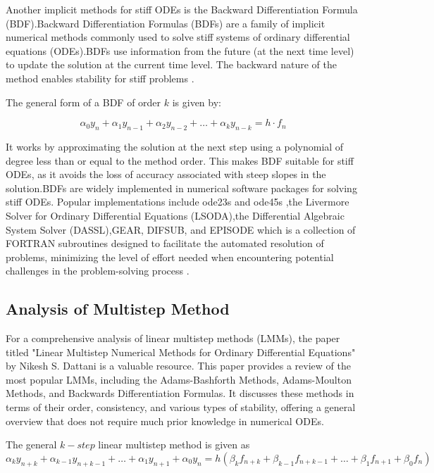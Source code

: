 Another implicit methods for stiff ODEs is the Backward Differentiation Formula (BDF).Backward Differentiation Formulas (BDFs) are a family of implicit numerical methods commonly used to solve stiff systems of ordinary differential equations (ODEs).BDFs use information from the future (at the next time level) to update the solution at the current time level. The backward nature of the method enables stability for stiff problems \cite{numericalrecipes}.

The general form of a BDF of order \(k\) is given by:

\begin{equation}
  \alpha_0 y_n + \alpha_1 y_{n-1} + \alpha_2 y_{n-2} + \ldots + \alpha_k y_{n-k} = h \cdot f_n
\end{equation}


It works by approximating the solution at the next step using a polynomial of degree less than or equal to the method order. This makes BDF suitable for stiff ODEs, as it avoids the loss of accuracy associated with steep slopes in the solution.BDFs are widely implemented in numerical software packages for solving stiff ODEs. Popular implementations include ode23s and ode45s \cite{shampine1997matlab},the Livermore Solver for Ordinary Differential Equations (LSODA),the Differential Algebraic System Solver (DASSL),GEAR, DIFSUB, and EPISODE \cite{Yatim2013} which is a collection of FORTRAN subroutines designed to facilitate the automated resolution of problems, minimizing the level of effort needed when encountering potential challenges in the problem-solving process \cite{thohura2013numerical}.


\subsection{Analysis of Multistep Method}

For a comprehensive analysis of linear multistep methods (LMMs), the paper titled "Linear Multistep Numerical Methods for Ordinary Differential Equations" by Nikesh S. Dattani is a valuable resource. This paper provides a review of the most popular LMMs, including the Adams-Bashforth Methods, Adams-Moulton Methods, and Backwards Differentiation Formulas. It discusses these methods in terms of their order, consistency, and various types of stability, offering a general overview that does not require much prior knowledge in numerical ODEs\cite{dattani2008linear}.

The general $k-step$ linear multistep method is given as 
\begin{equation}
  \alpha_k y_{n+k} + \alpha_{k-1} y_{n+k-1} + \ldots + \alpha_1 y_{n+1} + \alpha_0 y_n = h \left( \beta_k f_{n+k} + \beta_{k-1} f_{n+k-1} + \ldots + \beta_1 f_{n+1} + \beta_0 f_n \right)
\end{equation}

